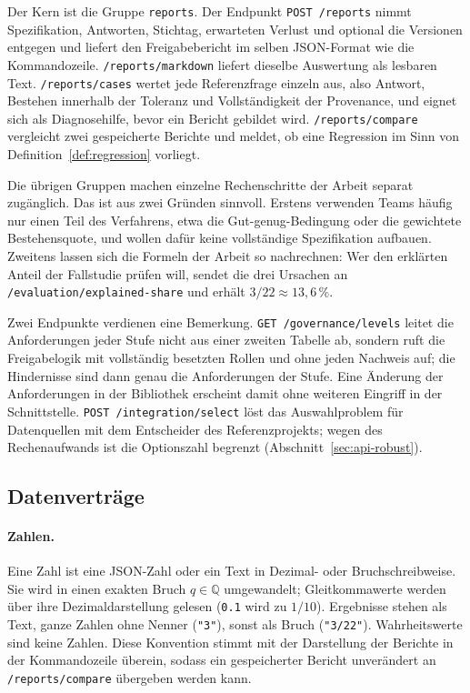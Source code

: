 \documentclass[a4paper,12pt]{article}
\theoremstyle{definition}
\newcommand{\QQ}{\mathbb{Q}}
\begin{document}
Der Kern ist die Gruppe \texttt{reports}. Der Endpunkt \texttt{POST /reports} nimmt Spezifikation, Antworten, Stichtag, erwarteten Verlust und optional die Versionen entgegen und liefert den Freigabebericht im selben JSON-Format wie die Kommandozeile. \texttt{/reports/markdown} liefert dieselbe Auswertung als lesbaren Text. \texttt{/reports/cases} wertet jede Referenzfrage einzeln aus, also Antwort, Bestehen innerhalb der Toleranz und Vollständigkeit der Provenance, und eignet sich als Diagnosehilfe, bevor ein Bericht gebildet wird. \texttt{/reports/compare} vergleicht zwei gespeicherte Berichte und meldet, ob eine Regression im Sinn von Definition~\ref{def:regression} vorliegt.

Die übrigen Gruppen machen einzelne Rechenschritte der Arbeit separat zugänglich. Das ist aus zwei Gründen sinnvoll. Erstens verwenden Teams häufig nur einen Teil des Verfahrens, etwa die Gut-genug-Bedingung oder die gewichtete Bestehensquote, und wollen dafür keine vollständige Spezifikation aufbauen. Zweitens lassen sich die Formeln der Arbeit so nachrechnen: Wer den erklärten Anteil der Fallstudie prüfen will, sendet die drei Ursachen an \texttt{/evaluation/explained-share} und erhält $3/22\approx 13{,}6\,\%$.

Zwei Endpunkte verdienen eine Bemerkung. \texttt{GET /governance/levels} leitet die Anforderungen jeder Stufe nicht aus einer zweiten Tabelle ab, sondern ruft die Freigabelogik mit vollständig besetzten Rollen und ohne jeden Nachweis auf; die Hindernisse sind dann genau die Anforderungen der Stufe. Eine Änderung der Anforderungen in der Bibliothek erscheint damit ohne weiteren Eingriff in der Schnittstelle. \texttt{POST /integration/select} löst das Auswahlproblem für Datenquellen mit dem Entscheider des Referenzprojekts; wegen des Rechenaufwands ist die Optionszahl begrenzt (Abschnitt~\ref{sec:api-robust}).

\subsection{Datenverträge}
\paragraph{Zahlen.}
Eine Zahl ist eine JSON-Zahl oder ein Text in Dezimal- oder Bruchschreibweise. Sie wird in einen exakten Bruch $q\in\QQ$ umgewandelt; Gleitkommawerte werden über ihre Dezimaldarstellung gelesen (\texttt{0.1} wird zu $1/10$). Ergebnisse stehen als Text, ganze Zahlen ohne Nenner (\texttt{"3"}), sonst als Bruch (\texttt{"3/22"}). Wahrheitswerte sind keine Zahlen. Diese Konvention stimmt mit der Darstellung der Berichte in der Kommandozeile überein, sodass ein gespeicherter Bericht unverändert an \texttt{/reports/compare} übergeben werden kann.
\end{document}
